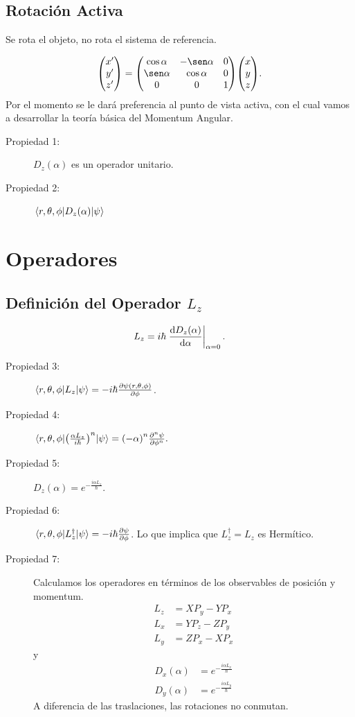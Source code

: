 \subsection{Rotación Activa}
Se rota el objeto, no rota el sistema de referencia.

$$ \mqty(x' \\ y' \\ z') = \mqty(\cos \alpha & -\sen \alpha & 0 \\ \sen \alpha & \cos \alpha & 0 \\ 0 & 0 & 1) \mqty(x \\ y \\ z). $$
Por el momento se le dará preferencia al punto de vista activa, con el cual vamos a desarrollar la teoría básica del Momentum Angular.

\begin{description}
	\item[Propiedad 1: ] $D_z (\alpha)$ es un operador unitario.
	\item[Propiedad 2: ] $\mel{r,\theta ,\phi}{D_z (\alpha)}{\psi}$
\end{description}


\section{Operadores}

\subsection{Definición del Operador $L_z$}
\begin{equation}
	L_z = i\hbar \eval{ \dv{D_z (\alpha)}{\alpha} }_{\alpha = 0}.
\end{equation}


\begin{description}
	\item[Propiedad 3: ] $\mel{r,\theta, \phi}{L_z}{\psi} = -i\hbar \pdv{\psi (r,\theta,\phi)}{\phi}$.
	\item[Propiedad 4: ] $\mel{r,\theta ,\phi}{\qty(\frac{\alpha L_z}{i\hbar})^n}{\psi} = \qty(-\alpha)^n \pdv[n]{\psi}{\phi}.$
	\item[Propiedad 5: ] $D_z (\alpha) = e^{-\frac{i\alpha L_z}{\hbar}}$.
	\item[Propiedad 6: ] $\mel{r,\theta ,\phi}{L_z ^\dagger}{\psi} = -i\hbar \pdv{\psi}{\phi}$. Lo que implica que $L_z ^\dagger = L_z$ es Hermítico.
	\item[Propiedad 7: ] Calculamos los operadores en términos de los observables de posición y momentum.
			\begin{align}
				L_z &= XP_y - YP_x \\
				L_x &= YP_z - ZP_y \\
				L_y &= ZP_x - XP_x 
			\end{align}
		y
			\begin{align*}
				D_x (\alpha) &= e^{-\frac{i\alpha L_x}{\hbar}} \\
				D_y (\alpha) &= e^{-\frac{i\alpha L_y}{\hbar}}
			\end{align*}
		A diferencia de las traslaciones, las rotaciones no conmutan.
\end{description}


